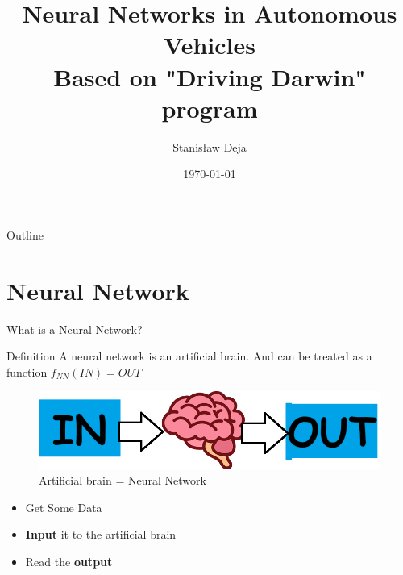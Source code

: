 \documentclass{beamer}
\title{%
  Neural Networks in Autonomous Vehicles \\
  \small Based on "Driving Darwin" program}
\author{Stanisław Deja}
\date{\today}
\begin{document}
\begin{frame}
  \titlepage
\end{frame}

\begin{frame}{Outline}
  \tableofcontents
\end{frame}

\section{Neural Network}
\begin{frame}{What is a Neural Network?}
    \begin{block}{Definition}
    A neural network is an artificial brain. And can be treated as a function 
    \begin{math}
    f_{NN}(IN)=OUT
    \end{math}
  \end{block}

  \begin{figure}
    \includegraphics[width=0.6\linewidth]{brain.png}
    \caption{Artificial brain = Neural Network}
  \end{figure}
  \begin{itemize}
      \item Get Some Data
      \item \textbf{Input} it to the artificial brain
      \item Read the \textbf{output}
  \end{itemize}
\end{frame}
\end{document}

